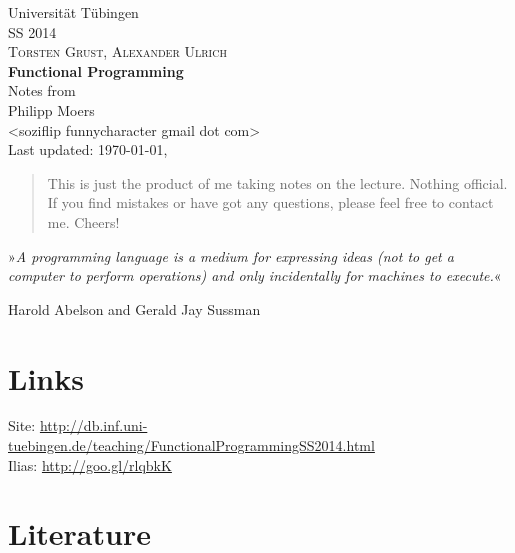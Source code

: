 \documentclass[12pt, oneside, a4paper, numbers=enddot, abstracton]{scrreprt}
\begin{document}

\begin{titlepage}
    \begin{center}
        \Large{Universität Tübingen}\\[1cm]
        \large{\scshape{SS 2014}}\\
        \large{\scshape{Torsten Grust, Alexander Ulrich}}\\[3cm]
        \Huge{\textbf{Functional Programming}}\\[6cm]
        \large{Notes from}\\[1cm]
        \large{Philipp Moers \\ <soziflip funnycharacter gmail dot com>}\\[3cm]
        \vfill
        \footnotesize{Last updated: \today, \currenttime}
    \end{center}
\end{titlepage}

\begin{abstract}
    This is just the product of me taking notes on the lecture. Nothing official. If you find mistakes or have got any questions, please feel free to contact me. Cheers!
\end{abstract}


\tableofcontents


\newpage

\vspace*{\fill}
»\textit{A programming language is a medium for expressing ideas (not to get a computer to perform operations) and only incidentally for machines to execute.}«\\
\begin{flushright}
    Harold Abelson and Gerald Jay Sussman
\end{flushright}
\vspace*{\fill}

\newpage


\section{Links}

Site: \url{http://db.inf.uni-tuebingen.de/teaching/FunctionalProgrammingSS2014.html}\\
Ilias: \url{http://goo.gl/rlqbkK}


\section{Literature}
\end{document}
